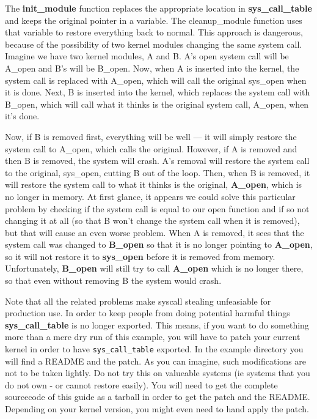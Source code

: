 \documentclass[10pt, oneside]{book}
\begin{document}
The \textbf{init\_module} function replaces the appropriate location in \textbf{sys\_call\_table} and keeps the original pointer in a variable.
The cleanup\_module function uses that variable to restore everything back to normal.
This approach is dangerous, because of the possibility of two kernel modules changing the same system call.
Imagine we have two kernel modules, A and B. A's open system call will be A\_open and B's will be B\_open.
Now, when A is inserted into the kernel, the system call is replaced with A\_open, which will call the original sys\_open when it is done.
Next, B is inserted into the kernel, which replaces the system call with B\_open, which will call what it thinks is the original system call, A\_open, when it's done.

Now, if B is removed first, everything will be well --- it will simply restore the system call to A\_open, which calls the original.
However, if A is removed and then B is removed, the system will crash.
A's removal will restore the system call to the original, sys\_open, cutting B out of the loop.
Then, when B is removed, it will restore the system call to what it thinks is the original, \textbf{A\_open}, which is no longer in memory.
At first glance, it appears we could solve this particular problem by checking if the system call is equal to our open function and if so not changing it at all (so that B won't change the system call when it is removed), but that will cause an even worse problem.
When A is removed, it sees that the system call was changed to \textbf{B\_open} so that it is no longer pointing to \textbf{A\_open}, so it will not restore it to \textbf{sys\_open} before it is removed from memory.
Unfortunately, \textbf{B\_open} will still try to call \textbf{A\_open} which is no longer there, so that even without removing B the system would crash.

Note that all the related problems make syscall stealing unfeasiable for production use.
In order to keep people from doing potential harmful things \textbf{sys\_call\_table} is no longer exported.
This means, if you want to do something more than a mere dry run of this example, you will have to patch your current kernel in order to have \verb|sys_call_table| exported.
In the example directory you will find a README and the patch.
As you can imagine, such modifications are not to be taken lightly.
Do not try this on valueable systems (ie systems that you do not own - or cannot restore easily).
You will need to get the complete sourcecode of this guide as a tarball in order to get the patch and the README.
Depending on your kernel version, you might even need to hand apply the patch.
\end{document}
